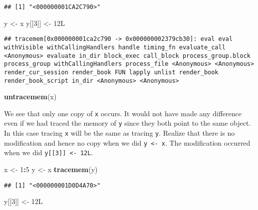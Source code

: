 \documentclass[]{book}
\newenvironment{Shaded}{\begin{snugshade}}{\end{snugshade}}
\newcommand{\DecValTok}[1]{\textcolor[rgb]{0.00,0.00,0.81}{#1}}
\newcommand{\KeywordTok}[1]{\textcolor[rgb]{0.13,0.29,0.53}{\textbf{#1}}}
\newcommand{\NormalTok}[1]{#1}
\newcommand{\OperatorTok}[1]{\textcolor[rgb]{0.81,0.36,0.00}{\textbf{#1}}}
\newcommand{\StringTok}[1]{\textcolor[rgb]{0.31,0.60,0.02}{#1}}
\begin{document}
\begin{verbatim}
## [1] "<000000001CA2C790>"
\end{verbatim}

\begin{Shaded}
\begin{Highlighting}[]
\NormalTok{y <-}\StringTok{ }\NormalTok{x}
\NormalTok{y[[}\DecValTok{3}\NormalTok{]] <-}\StringTok{ }\NormalTok{12L}
\end{Highlighting}
\end{Shaded}

\begin{verbatim}
## tracemem[0x000000001ca2c790 -> 0x000000002379cb30]: eval eval withVisible withCallingHandlers handle timing_fn evaluate_call <Anonymous> evaluate in_dir block_exec call_block process_group.block process_group withCallingHandlers process_file <Anonymous> <Anonymous> render_cur_session render_book FUN lapply unlist render_book render_book_script in_dir <Anonymous> <Anonymous>
\end{verbatim}

\begin{Shaded}
\begin{Highlighting}[]
\KeywordTok{untracemem}\NormalTok{(x)}
\end{Highlighting}
\end{Shaded}

We see that only one copy of \texttt{x} occurs. It would not have made any difference even if we had traced the memory of \texttt{y} since they both point to the same object. In this case tracing \texttt{x} will be the same as tracing \texttt{y}. Realize that there is no modification and hence no copy when we did \texttt{y\ \textless{}-\ x}. The modification occurred when we did \texttt{y{[}{[}3{]}{]}\ \textless{}-\ 12L}.

\begin{Shaded}
\begin{Highlighting}[]
\NormalTok{x <-}\StringTok{ }\DecValTok{1}\OperatorTok{:}\DecValTok{5}
\NormalTok{y <-}\StringTok{ }\NormalTok{x}
\KeywordTok{tracemem}\NormalTok{(y)}
\end{Highlighting}
\end{Shaded}

\begin{verbatim}
## [1] "<000000001D0D4A70>"
\end{verbatim}

\begin{Shaded}
\begin{Highlighting}[]
\NormalTok{y[[}\DecValTok{3}\NormalTok{]] <-}\StringTok{ }\NormalTok{12L}
\end{Highlighting}
\end{Shaded}
\end{document}
